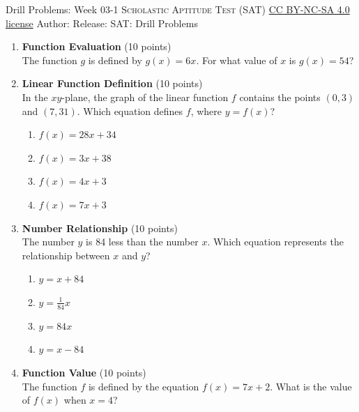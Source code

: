 \newpage\handout
{Drill Problems: Week 03-1}
{\textsc{Scholastic Aptitude Test (SAT)}}
{\href{https://creativecommons.org/licenses/by-nc-sa/4.0/}{CC BY-NC-SA 4.0 license}}
{Author: \BookAuthor}{Release: \generatedOn}
{SAT: Drill Problems}


\begin{enumerate}
  \item \textbf{Function Evaluation} (10 points)\\
  The function $g$ is defined by $g(x)=6x$. For what value of $x$ is $g(x)=54$?
  \begin{subanswer}
  \end{subanswer}

  \item \textbf{Linear Function Definition} (10 points)\\
  In the $xy$-plane, the graph of the linear function $f$ contains the points $(0,3)$ and $(7,31)$. Which equation defines $f$, where $y=f(x)$?\\
  \begin{enumerate}[label=(\Alph*)]
    \item $f(x)=28x+34$
    \item $f(x)=3x+38$
    \item $f(x)=4x+3$
    \item $f(x)=7x+3$
  \end{enumerate}
  \begin{subanswer}
  \end{subanswer}

  \item \textbf{Number Relationship} (10 points)\\
  The number $y$ is 84 less than the number $x$. Which equation represents the relationship between $x$ and $y$?\\
  \begin{enumerate}[label=(\Alph*)]
    \item $y=x+84$
    \item $y=\frac{1}{84}x$
    \item $y=84x$
    \item $y=x-84$
  \end{enumerate}
  \begin{subanswer}
  \end{subanswer}

  \item \textbf{Function Value} (10 points)\\
  The function $f$ is defined by the equation $f(x)=7x+2$. What is the value of $f(x)$ when $x=4$?
  \begin{subanswer}
  \end{subanswer}




\end{enumerate}
